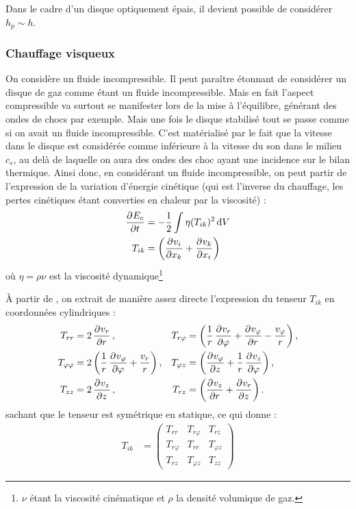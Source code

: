 Dans le cadre d'un disque optiquement épais, il devient possible de considérer $h_p \sim h$.


\subsubsection{Chauffage visqueux}
On considère un fluide incompressible. Il peut paraître étonnant de considérer un disque de gaz comme étant un fluide incompressible. Mais en fait l'aspect compressible va surtout se manifester lors de la mise à l'équilibre, générant des ondes de chocs par exemple. Mais une fois le disque stabilisé tout se passe comme si on avait un fluide incompressible. C'est matérialisé par le fait que la vitesse dans le disque est considérée comme inférieure à la vitesse du son dans le milieu $c_s$, au delà de laquelle on aura des ondes des choc ayant une incidence sur le bilan thermique. Ainsi donc, en considérant un fluide incompressible, on peut partir de l'expression de la variation d'énergie cinétique (qui est l'inverse du chauffage, les pertes cinétiques étant converties en chaleur par la viscosité) \citep[(16.3)]{landau1989mecanique} : 
\begin{align}
\dpd{E_c}{t} &= - \frac{1}{2}\int \eta(T_{ik})^2\dif V\\
T_{ik} &= \left(\dpd{v_i}{x_k} + \dpd{v_k}{x_i}\right)\nonumber
\end{align}
où $\eta = \rho\nu$ est la viscosité dynamique\footnote{$\nu$ étant la viscosité cinématique et $\rho$ la densité volumique de gaz.}

À partir de \citep[(15.8) et (15.17)]{landau1989mecanique}, on extrait de manière assez directe l'expression du tenseur $T_{ik}$ en coordonnées cylindriques : 
\begin{align}
T_{rr} &= 2\dpd{v_r}{r}, & T_{r\varphi} &= \left(\inv{r} \dpd{v_r}{\varphi} + \dpd{v_\varphi}{r} - \frac{v_\varphi}{r}\right),\nonumber\\
T_{\varphi\varphi} &= 2 \left(\inv{r} \dpd{v_\varphi}{\varphi} + \frac{v_r}{r}\right), & T_{\varphi z} &= \left(\dpd{v_\varphi}{z} + \inv{r}\dpd{v_z}{\varphi}\right),\\
T_{zz} &= 2\dpd{v_z}{z}, & T_{rz} &= \left(\dpd{v_z}{r} + \dpd{v_r}{z}\right).\nonumber
\end{align}
sachant que le tenseur est symétrique en statique, ce qui donne : 
\begin{align}
T_{ik} &= \begin{pmatrix}
T_{rr} & T_{r\varphi} & T_{rz}\\
T_{r\varphi} & T_{rr} & T_{\varphi z}\\
T_{rz} & T_{\varphi z} & T_{zz}
\end{pmatrix}
\end{align}

